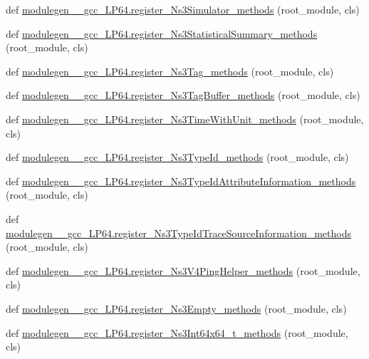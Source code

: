 \begin{DoxyCompactItemize}
\item 
def \hyperlink{namespacemodulegen____gcc__LP64_ac43918825b198877acafaae4cbc1c9e0}{modulegen\+\_\+\+\_\+gcc\+\_\+\+L\+P64.\+register\+\_\+\+Ns3\+Simulator\+\_\+methods} (root\+\_\+module, cls)
\item 
def \hyperlink{namespacemodulegen____gcc__LP64_ac901c5def09fdbae12bba2735d07f8d1}{modulegen\+\_\+\+\_\+gcc\+\_\+\+L\+P64.\+register\+\_\+\+Ns3\+Statistical\+Summary\+\_\+methods} (root\+\_\+module, cls)
\item 
def \hyperlink{namespacemodulegen____gcc__LP64_a8667a8c9dd38f2a77c66b6851250f1cb}{modulegen\+\_\+\+\_\+gcc\+\_\+\+L\+P64.\+register\+\_\+\+Ns3\+Tag\+\_\+methods} (root\+\_\+module, cls)
\item 
def \hyperlink{namespacemodulegen____gcc__LP64_a77191b364d09e6ccbe9b803bee493b0a}{modulegen\+\_\+\+\_\+gcc\+\_\+\+L\+P64.\+register\+\_\+\+Ns3\+Tag\+Buffer\+\_\+methods} (root\+\_\+module, cls)
\item 
def \hyperlink{namespacemodulegen____gcc__LP64_a054aa04457970b1c07a67d49cafee187}{modulegen\+\_\+\+\_\+gcc\+\_\+\+L\+P64.\+register\+\_\+\+Ns3\+Time\+With\+Unit\+\_\+methods} (root\+\_\+module, cls)
\item 
def \hyperlink{namespacemodulegen____gcc__LP64_adea84ddbc489895d2347d15ea1328bc0}{modulegen\+\_\+\+\_\+gcc\+\_\+\+L\+P64.\+register\+\_\+\+Ns3\+Type\+Id\+\_\+methods} (root\+\_\+module, cls)
\item 
def \hyperlink{namespacemodulegen____gcc__LP64_aae2764584a69687644f37b42586364df}{modulegen\+\_\+\+\_\+gcc\+\_\+\+L\+P64.\+register\+\_\+\+Ns3\+Type\+Id\+Attribute\+Information\+\_\+methods} (root\+\_\+module, cls)
\item 
def \hyperlink{namespacemodulegen____gcc__LP64_af7ee3e03193815233627c2c4b4b2ebf6}{modulegen\+\_\+\+\_\+gcc\+\_\+\+L\+P64.\+register\+\_\+\+Ns3\+Type\+Id\+Trace\+Source\+Information\+\_\+methods} (root\+\_\+module, cls)
\item 
def \hyperlink{namespacemodulegen____gcc__LP64_a317a5fbbeef2f08792def9f7b99de254}{modulegen\+\_\+\+\_\+gcc\+\_\+\+L\+P64.\+register\+\_\+\+Ns3\+V4\+Ping\+Helper\+\_\+methods} (root\+\_\+module, cls)
\item 
def \hyperlink{namespacemodulegen____gcc__LP64_af245edb84966d4b4c48221a31647be89}{modulegen\+\_\+\+\_\+gcc\+\_\+\+L\+P64.\+register\+\_\+\+Ns3\+Empty\+\_\+methods} (root\+\_\+module, cls)
\item 
def \hyperlink{namespacemodulegen____gcc__LP64_a1239c8a15c3a5d5ac5184bd53add8029}{modulegen\+\_\+\+\_\+gcc\+\_\+\+L\+P64.\+register\+\_\+\+Ns3\+Int64x64\+\_\+t\+\_\+methods} (root\+\_\+module, cls)

\end{DoxyCompactItemize}
